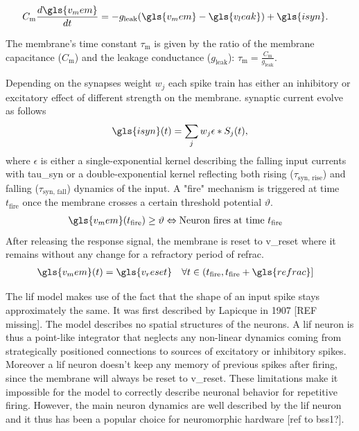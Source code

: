 \begin{align}
\label{lifeq}
C_{\text{m}} \frac{d\gls{v_mem}}{dt} &= -g_{\text{leak}} (\gls{v_mem} - \gls{v_leak}) + \gls{isyn}.
\end{align}

The membrane's time constant $\tau_\text{m}$ is given by the ratio of the membrane capacitance ($C_{\text{m}}$) and the leakage conductance ($g_{\text{leak}}$): $\tau_\text{m} = \frac{C_{\text{m}}}{g_{\text{leak}}}$. 

Depending on the synapses weight $w_j$ each spike train has either an inhibitory or excitatory effect of different strength on the membrane.  synaptic current evolve as follows
\begin{equation}
\label{synpatic_input}
\gls{isyn}(t) = \sum_j w_j \epsilon \ast S_j(t), 
\end{equation}
where $\epsilon$ is either a single-exponential kernel describing the falling input currents with \gls{tau_syn} or a double-exponential kernel reflecting both rising ($\tau_\text{syn, rise}$) and falling ($\tau_\text{syn, fall}$) dynamics of the input. %
A "fire" mechanism is triggered at time $t_{\text{fire}}$ once the membrane crosses a certain threshold potential $\mathcal{\vartheta}$. 
\begin{align}
\gls{v_mem}(t_{\text{fire}}) &\ge \vartheta \Leftrightarrow \text{Neuron fires at time } t_{\text{fire}}
\end{align}
After releasing the response signal, the membrane is reset to \gls{v_reset} where it remains without any change for a refractory period of \gls{refrac}. 
\begin{align}
\gls{v_mem}(t) &= \gls{v_reset} \quad \forall t \in (t_{\text{fire}}, t_{\text{fire}} + \gls{refrac}] 
\end{align}


The \gls{lif} model makes use of the fact that the shape of an input spike stays approximately the same. It was first described by Lapicque in 1907 [REF missing]. The model describes no spatial structures of the neurons. A \gls{lif} neuron is thus a point-like integrator that neglects any non-linear dynamics coming from strategically positioned connections to sources of excitatory or inhibitory spikes. Moreover a \gls{lif} neuron doesn't keep any memory of previous spikes after firing, since the membrane will always be reset to \gls{v_reset}. These limitations make it impossible for the model to correctly describe neuronal behavior for repetitive firing. However, the main neuron dynamics are well described by the \gls{lif} neuron and it thus has been a popular choice for neuromorphic hardware [ref to \gls{bss1}?].\\

